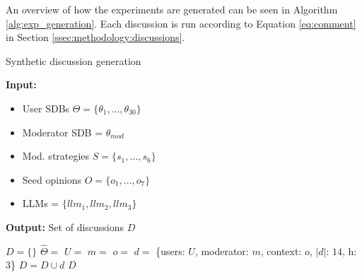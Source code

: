 An overview of how the experiments are generated can be seen in Algorithm \ref{alg:exp_generation}. Each discussion is run according to Equation \ref{eq:comment} in Section \ref{ssec:methodology:discussions}. 

\begin{algorithm}
\caption{Synthetic discussion generation}
\label{alg:exp_generation}
\hspace*{\algorithmicindent} \textbf{Input:} 
         \begin{itemize}[noitemsep, nosep]
             \item User \acp{SDB} $\Theta = \{\theta_1, \dots, \theta_{30}\}$
             \item Moderator \ac{SDB} = $\theta_{mod}$
             \item Mod. strategies $S = \{s_1, \ldots, s_6\}$
             \item Seed opinions $O = \{o_1, \ldots, o_7\}$
             \item \acp{LLM} = $\{llm_1, llm_2, llm_3\}$
         \end{itemize}
         \hspace*{\algorithmicindent} \textbf{Output:} Set of discussions $D$
\begin{algorithmic}[1]
    \State $D = \{\}$
                \State $\hat{\Theta} = $ 
                \State $U =$  
                \State $m = $ 
                \State $o = $ 
                \State $d =$ \{users: $U$, moderator: $m$, context: $o$, $\vert d \rvert$: $14$, h: $3$\}
                \State $D = D \cup d$
            \EndFor
        \EndFor
    \EndFor
    \State \Return $D$
\end{algorithmic}
\end{algorithm}

